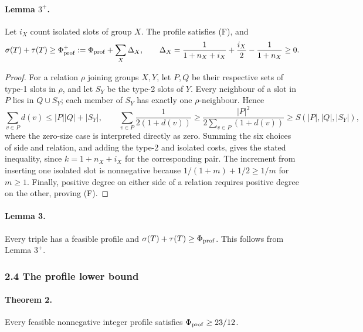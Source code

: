 \paragraph{Lemma $3^+$.} Let $i_X$ count isolated slots of group $X$. The profile satisfies (F), and
\[
 \sigma(T)+\tau(T)\geq\Phi_{\rm prof}^+
 :=\Phi_{\rm prof}+\sum_X\Delta_X,\qquad
 \Delta_X=\frac1{1+n_X+i_X}+\frac{i_X}2-\frac1{1+n_X}\geq0.
\]
\begin{proof}
For a relation $\rho$ joining groups $X,Y$, let $P,Q$ be their respective sets of type-1 slots in $\rho$, and let $S_Y$ be the type-2 slots of $Y$. Every neighbour of a slot in $P$ lies in $Q\cup S_Y$; each member of $S_Y$ has exactly one $\rho$-neighbour. Hence
\[
 \sum_{v\in P}d(v)\leq |P||Q|+|S_Y|,
 \qquad
 \sum_{v\in P}\frac1{2(1+d(v))}
 \geq\frac{|P|^2}{2\sum_{v\in P}(1+d(v))}
 \geq S(|P|,|Q|,|S_Y|),
\]
where the zero-size case is interpreted directly as zero. Summing the six choices of side and relation, and adding the type-2 and isolated costs, gives the stated inequality, since $k=1+n_X+i_X$ for the corresponding pair. The increment from inserting one isolated slot is nonnegative because $1/(1+m)+1/2\geq1/m$ for $m\geq1$. Finally, positive degree on either side of a relation requires positive degree on the other, proving (F).
\end{proof}
\paragraph{Lemma 3.} Every triple has a feasible profile and $\sigma(T)+\tau(T)\geq\Phi_{\rm prof}$. This follows from Lemma $3^+$.

\subsubsection*{2.4 The profile lower bound}
\paragraph{Theorem 2.} Every feasible nonnegative integer profile satisfies $\Phi_{\rm prof}\geq23/12$.

